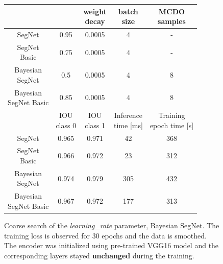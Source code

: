 \renewcommand{\arraystretch}{1.1}
\begin{figure}[h]
	\centering	
	\begin{tabular}{|c|c|c|c|c|}
		\hline
		\thead{Architecture} & \thead{base\_lr} & \thead{weight \\ decay} & \thead{batch \\ size} & \thead{MCDO \\ samples}\\		
		\hline
		SegNet & 0.95 & 0.0005 & 4 & - \\
		\hline
		\makecell{SegNet \\ Basic} & 0.75 & 0.0005 & 4 & - \\
		\hline
		\makecell{Bayesian \\ SegNet} & 0.5 & 0.0005 & 4 & 8 \\	
		\hline
		\makecell{Bayesian \\ SegNet Basic} & 0.85 & 0.0005 & 4 & 8 \\
		\hline
		& \thead{IOU \\ class 0} & \thead{IOU \\ class 1} & \thead{Inference \\ time [ms] } & \thead{Training \\ epoch time [s] }\\		
		\hline	
		SegNet & 0.965 & 0.971 & 42 & 368 \\	
		\hline	
		\makecell{SegNet \\ Basic} & 0.966 & 0.972 & 23 & 312 \\	
		\hline	
		\makecell{Bayesian \\ SegNet} & 0.974 & 0.979 & 305 & 432 \\	
		\hline	
		\makecell{Bayesian \\ SegNet Basic} & 0.967 & 0.972 & 177 & 313 \\
		\hline
	\end{tabular}
	\vspace{10mm}
	\caption{Coarse search of the \textit{learning\_rate} parameter, Bayesian SegNet. The training loss is observed for 30 epochs and the data is smoothed. The encoder was initialized using pre-trained VGG16 model and the corresponding layers stayed \textbf{unchanged} during the training.} 
	\label{zdarec}
\end{figure}

